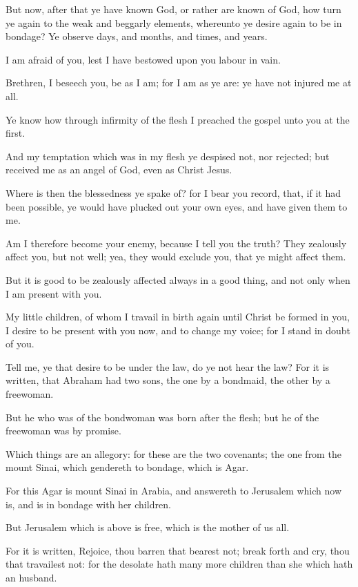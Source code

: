 \verse But now, after that ye have known God, or rather are known of God, how turn ye again to the weak and beggarly elements, whereunto ye desire again to be in bondage?  \verse Ye observe days, and months, and times, and years.

\verse I am afraid of you, lest I have bestowed upon you labour in vain.

\verse Brethren, I beseech you, be as I am; for I am as ye are: ye have not injured me at all.

\verse Ye know how through infirmity of the flesh I preached the gospel unto you at the first.

\verse And my temptation which was in my flesh ye despised not, nor rejected; but received me as an angel of God, even as Christ Jesus.

\verse Where is then the blessedness ye spake of? for I bear you record, that, if it had been possible, ye would have plucked out your own eyes, and have given them to me.

\verse Am I therefore become your enemy, because I tell you the truth?  \verse They zealously affect you, but not well; yea, they would exclude you, that ye might affect them.

\verse But it is good to be zealously affected always in a good thing, and not only when I am present with you.

\verse My little children, of whom I travail in birth again until Christ be formed in you, \verse I desire to be present with you now, and to change my voice; for I stand in doubt of you.

\verse Tell me, ye that desire to be under the law, do ye not hear the law?  \verse For it is written, that Abraham had two sons, the one by a bondmaid, the other by a freewoman.

\verse But he who was of the bondwoman was born after the flesh; but he of the freewoman was by promise.

\verse Which things are an allegory: for these are the two covenants; the one from the mount Sinai, which gendereth to bondage, which is Agar.

\verse For this Agar is mount Sinai in Arabia, and answereth to Jerusalem which now is, and is in bondage with her children.

\verse But Jerusalem which is above is free, which is the mother of us all.

\verse For it is written, Rejoice, thou barren that bearest not; break forth and cry, thou that travailest not: for the desolate hath many more children than she which hath an husband.

